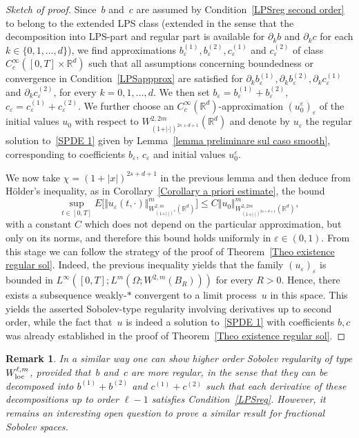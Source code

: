 \documentclass[a4paper,10pt]{article}
\newtheorem{remark}[theorem]{Remark}
\newcommand\1{\mathbbm{1}}
\newcommand{\mr}{\mathbb{R}}
\newcommand{\eps}{\varepsilon}
\newcommand\loc{{\rm loc}}
\numberwithin{equation}{section}
\begin{document}
\begin{proof}[Sketch of proof]
Since~$b$ and~$c$ are assumed by Condition~\ref{LPSreg second order} to belong to the extended LPS class (extended in the sense that the decomposition into LPS-part and regular part is available for $\partial_k b$ and $\partial_k c$ for each $k \in \{0,1,\ldots, d\}$), we find approximations $b_{\eps}^{(1)}, b_{\eps}^{(2)}, c_{\eps}^{(1)}$ and $c_{\eps}^{(2)}$ of class $C_{c}^{\infty}([0,T]\times\mr^d)$ such that all assumptions concerning boundedness or convergence in Condition~\ref{LPSappprox} are satisfied for $\partial_k b_{\eps}^{(1)}, \partial_k b_{\eps}^{(2)}, \partial_k c_{\eps}^{(1)}$ and $\partial_k c_{\eps}^{(2)}$, for every $k=0,1,\ldots,d$. We then set  $b_{\eps}=b_{\eps}^{(1)}+b_{\eps}^{(2)}$,  $c_{\eps}=c_{\eps}^{(1)} + c_{\eps}^{(2)}$. We further choose an $C^\infty_c(\mr^d)$-approximation $(u_0^\eps)_\eps$ of the initial values $u_0$ with respect to $W_{(1+\vert \cdot\vert )^{2s+d+1}}^{2,2m}(\mathbb{R}^{d})$ and denote by $u_{\eps}$ the regular solution to~\eqref{SPDE 1} given by Lemma~\ref{lemma preliminare sul caso smooth}, corresponding to coefficients $b_\eps$, $c_\eps$ and initial values $u_0^\eps$.

We now take $\chi = (1+|x|)^{2s+d+1}$ in the previous lemma and then deduce from H\"older's inequality, as in Corollary~\ref{Corollary a priori estimate}, the bound
\begin{equation*}
\sup_{t\in [0,T]}E \Big[ \Vert u_\eps(t,\cdot)\Vert_{W_{(1+\vert \cdot \vert)^{s}}^{2,m}(\mathbb{R}^{d})}^{m} \Big] \leq C \Vert u_{0} \Vert_{W_{(1+\vert \cdot \vert)^{2s+d+1}}^{2,2m}(\mathbb{R}^{d})}^{m},
\end{equation*}
with a constant $C$ which does not depend on the particular approximation, but only on its norms, and therefore this bound holds uniformly in $\eps \in (0,1)$. From this stage we can follow the strategy of the proof of Theorem~\ref{Theo existence regular sol}. Indeed, the previous inequality yields that the family $(u_\eps)_\eps$ is bounded in $L^\infty([0,T];L^m(\Omega;W^{2,m}(B_R)))$ for every $R>0$. Hence, there exists a subsequence weakly-$*$ convergent to a limit process~$u$ in this space. This yields the asserted Sobolev-type regularity involving derivatives up to second order, while the fact that~$u$ is indeed a solution to~\eqref{SPDE 1} with coefficients $b,c$ was already established in the proof of Theorem~\ref{Theo existence regular sol}.
\end{proof}

\begin{remark}
In a similar way one can show higher order Sobolev regularity of type $W^{\ell,m}_{\loc}$, provided that~$b$ and~$c$ are more regular, in the sense that they can be decomposed into $b^{(1)}+b^{(2)}$ and $c^{(1)}+c^{(2)}$ such that each derivative of these decompositions up to order $\ell-1$ satisfies Condition~\ref{LPSreg}. However, it remains an interesting open question to prove a similar result for fractional Sobolev spaces.
\end{remark}
\end{document}
